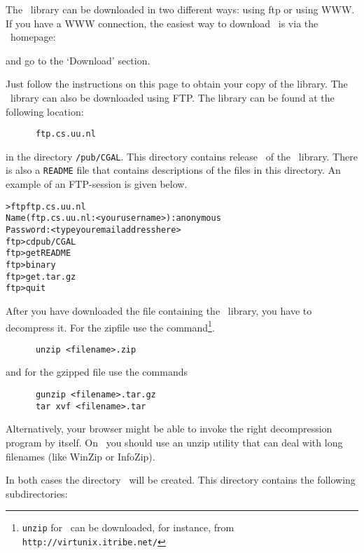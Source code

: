The \cgal\ library can be downloaded in two different ways: using ftp
or using WWW.  If you have a WWW connection, the easiest way to
download \cgal\ is via the \cgal\ homepage:
\begin{quote}
      \cgalhomepage
\end{quote}
and go to the `Download' section.

Just follow the instructions on this page to obtain your copy of the
library. The \cgal\ library can also be downloaded using FTP. The
library can be found at the following location:

\begin{verbatim}
      ftp.cs.uu.nl
\end{verbatim}

in the directory \texttt{/pub/CGAL}. This directory contains release
\cgalrelease\ of the \cgal\ library. There is also a \texttt{README}
file that contains descriptions of the files in this directory. An
example of an FTP-session is given below.

\begin{alltt}
      > ftp ftp.cs.uu.nl 
      Name (ftp.cs.uu.nl:<your username>): anonymous
      Password: <type your email address here>
      ftp> cd pub/CGAL
      ftp> get README
      ftp> binary
      ftp> get \cgaldir.tar.gz
      ftp> quit
\end{alltt}

After you have downloaded the file containing the \cgal\ library, you
have to decompress it. For the zipfile use the
command\footnote{\texttt{unzip} for \mswin\ 
can be downloaded, for instance, from
\texttt{http://virtunix.itribe.net/}}.

\begin{verbatim}
      unzip <filename>.zip
\end{verbatim}

and for the gzipped file use the commands

\begin{verbatim}
      gunzip <filename>.tar.gz
      tar xvf <filename>.tar
\end{verbatim}

Alternatively, your browser might be able to invoke the right
decompression program by itself.
On \mswin\ you should use an unzip utility that can deal with long
filenames (like WinZip or InfoZip).

In both cases the directory \cgaldir\ will be created. This directory
contains the following subdirectories:\index{directories!structure}

